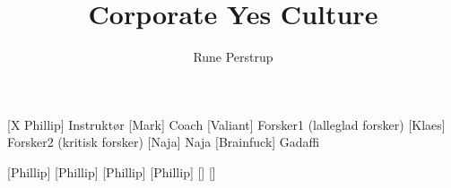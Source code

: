 \documentclass[a4paper,11pt]{article}
\title{Corporate Yes Culture}
\author{Rune Perstrup}
\begin{document}
 \maketitle

\begin{roles}
    [X Phillip] Instruktør
    [Mark]    Coach
    [Valiant]    Forsker1 (lalleglad forsker)
    [Klaes]    Forsker2 (kritisk forsker)
    [Naja]    Naja
    [Brainfuck] Gadaffi
\end{roles}

 \begin{props}
   [Phillip]
   [Phillip]
   [Phillip]
   [Phillip]
   []
   []
 \end{props}
\end{document}
